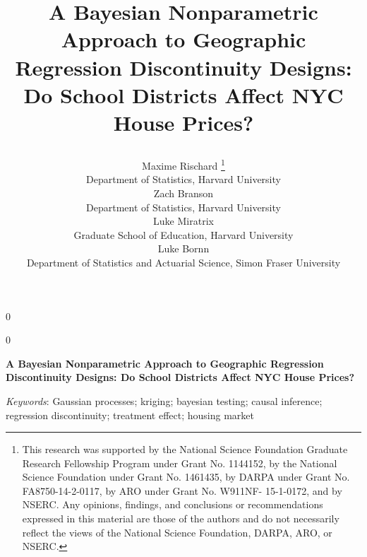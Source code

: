 \documentclass[12pt]{article}
\newcommand{\georddtitle}{
    A Bayesian Nonparametric Approach to Geographic Regression Discontinuity Designs:
    Do School Districts Affect NYC House Prices?
}
\newcommand{\georddkeywords}{Gaussian processes; kriging; bayesian testing; causal inference; regression discontinuity; treatment effect; housing market}
\newcommand{\blind}{0}
\newcommand{\georddauthor}{
    Maxime Rischard
    \thanks{
This research was supported by the National Science Foundation Graduate Research Fellowship Program under Grant No. 1144152, by the National Science Foundation under Grant No. 1461435, by DARPA under Grant No. FA8750-14-2-0117, by ARO under Grant No. W911NF- 15-1-0172, and by NSERC. Any opinions, findings, and conclusions or recommendations expressed in this material are those of the authors and do not necessarily reflect the views of the National Science Foundation, DARPA, ARO, or NSERC.}
    \vspace{-0.5em}
    \\
    Department of Statistics, Harvard University \\

    Zach Branson \vspace{-0.5em} \\
    Department of Statistics, Harvard University \\

    Luke Miratrix \vspace{-0.5em} \\
    Graduate School of Education, Harvard University \\

    Luke Bornn \vspace{-0.5em} \\
    Department of Statistics and Actuarial Science, Simon Fraser University 
}
\begin{document}
\doublespacing



\blind
{
\title{
    \Large
    \bf
    \georddtitle
}
\author{\georddauthor}
\maketitle
} \fi

\blind
{
  \bigskip
  \bigskip
  \bigskip
  \begin{center}
    {\LARGE\bf \georddtitle}
\end{center}
  \medskip
} \fi
\begin{abstract}
    
\end{abstract}

\noindent%
{\it Keywords}: \georddkeywords
\vfill
\newpage






\begin{appendices}
    
\end{appendices}
\end{document}
